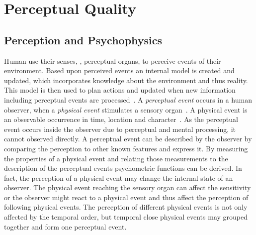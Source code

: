 \chapter{Perceptual Quality}\label{chap:02}

\section{Perception and Psychophysics}
Human use their senses, \ie, perceptual organs, to perceive events of their environment.
Based upon perceived events an internal model is created and updated, which incorporates knowledge about the environment and thus reality.
This model is then used to plan actions and updated when new information including perceptual events are processed~\citep[p. 4]{blauert_spatial_1996}.
A \emph{perceptual event} occurs in a human observer, when a \emph{physical event} stimulates a sensory organ~\citep{blauert_spatial_1996}.
A physical event is an observable occurrence in time, location and character~\citep{callet_qualinet_2013}.
As the perceptual event occurs inside the observer due to perceptual and mental processing, it cannot observed directly.
A perceptual event can be described by the observer by comparing the perception to other known features and express it.
By measuring the properties of a physical event and relating those measurements to the description of the perceptual events psychometric functions can be derived.
In fact, the perception of a physical event may change the internal state of an observer.
The physical event reaching the sensory organ can affect the sensitivity or the observer might react to a physical event and thus affect the perception of following physical events.
The perception of different physical events is not only affected by the temporal order, but temporal close physical events may grouped together and form one perceptual event.

